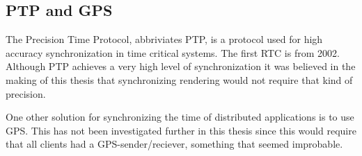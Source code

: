 \subsection{PTP and GPS}

The Precision Time Protocol, abbriviates PTP, is a protocol used for high accuracy synchronization in time critical systems. The first RTC is from 2002. Although PTP achieves a very high level of synchronization it was believed in the making of this thesis that synchronizing rendering would not require that kind of precision. 

One other solution for synchronizing the time of distributed applications is to use GPS. This has not been investigated further in this thesis since this would require that all clients had a GPS-sender/reciever, something that seemed improbable. 
